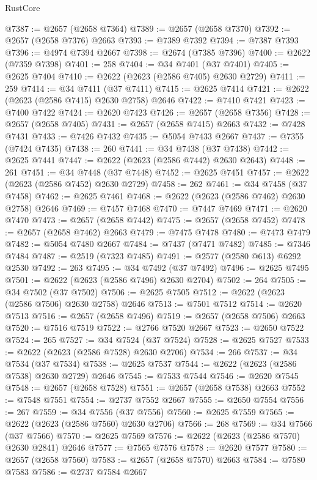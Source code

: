 \begin{lexlean}{RustCore}
\begin{coremodule}
@7387 := @2657 (@2658 @7364)
@7389 := @2657 (@2658 @7370)
@7392 := @2657 (@2658 @7376) @2663
@7393 := @7389 @7392
@7394 := @7387 @7393
@7396 := @4974 @7394 @2667
@7398 := @2674 (@7385 @7396)
@7400 := @2622 (@7359 @7398)
@7401 := 258
@7404 := @34 @7401 (@37 @7401)
@7405 := @2625 @7404
@7410 := @2622 (@2623 (@2586 @7405) @2630 @2729)
@7411 := 259
@7414 := @34 @7411 (@37 @7411)
@7415 := @2625 @7414
@7421 := @2622 (@2623 (@2586 @7415) @2630 @2758) @2646
@7422 := @7410 @7421
@7423 := @7400 @7422
@7424 := @2620 @7423
@7426 := @2657 (@2658 @7356)
@7428 := @2657 (@2658 @7405)
@7431 := @2657 (@2658 @7415) @2663
@7432 := @7428 @7431
@7433 := @7426 @7432
@7435 := @5054 @7433 @2667
@7437 := @7355 (@7424 @7435)
@7438 := 260
@7441 := @34 @7438 (@37 @7438)
@7442 := @2625 @7441
@7447 := @2622 (@2623 (@2586 @7442) @2630 @2643)
@7448 := 261
@7451 := @34 @7448 (@37 @7448)
@7452 := @2625 @7451
@7457 := @2622 (@2623 (@2586 @7452) @2630 @2729)
@7458 := 262
@7461 := @34 @7458 (@37 @7458)
@7462 := @2625 @7461
@7468 := @2622 (@2623 (@2586 @7462) @2630 @2758) @2646
@7469 := @7457 @7468
@7470 := @7447 @7469
@7471 := @2620 @7470
@7473 := @2657 (@2658 @7442)
@7475 := @2657 (@2658 @7452)
@7478 := @2657 (@2658 @7462) @2663
@7479 := @7475 @7478
@7480 := @7473 @7479
@7482 := @5054 @7480 @2667
@7484 := @7437 (@7471 @7482)
@7485 := @7346 @7484
@7487 := @2519 (@7323 @7485)
@7491 := @2577 (@2580 @613) @6292 @2530
@7492 := 263
@7495 := @34 @7492 (@37 @7492)
@7496 := @2625 @7495
@7501 := @2622 (@2623 (@2586 @7496) @2630 @2704)
@7502 := 264
@7505 := @34 @7502 (@37 @7502)
@7506 := @2625 @7505
@7512 := @2622 (@2623 (@2586 @7506) @2630 @2758) @2646
@7513 := @7501 @7512
@7514 := @2620 @7513
@7516 := @2657 (@2658 @7496)
@7519 := @2657 (@2658 @7506) @2663
@7520 := @7516 @7519
@7522 := @2766 @7520 @2667
@7523 := @2650 @7522
@7524 := 265
@7527 := @34 @7524 (@37 @7524)
@7528 := @2625 @7527
@7533 := @2622 (@2623 (@2586 @7528) @2630 @2706)
@7534 := 266
@7537 := @34 @7534 (@37 @7534)
@7538 := @2625 @7537
@7544 := @2622 (@2623 (@2586 @7538) @2630 @2729) @2646
@7545 := @7533 @7544
@7546 := @2620 @7545
@7548 := @2657 (@2658 @7528)
@7551 := @2657 (@2658 @7538) @2663
@7552 := @7548 @7551
@7554 := @2737 @7552 @2667
@7555 := @2650 @7554
@7556 := 267
@7559 := @34 @7556 (@37 @7556)
@7560 := @2625 @7559
@7565 := @2622 (@2623 (@2586 @7560) @2630 @2706)
@7566 := 268
@7569 := @34 @7566 (@37 @7566)
@7570 := @2625 @7569
@7576 := @2622 (@2623 (@2586 @7570) @2630 @2841) @2646
@7577 := @7565 @7576
@7578 := @2620 @7577
@7580 := @2657 (@2658 @7560)
@7583 := @2657 (@2658 @7570) @2663
@7584 := @7580 @7583
@7586 := @2737 @7584 @2667

\end{coremodule}
\end{lexlean}
